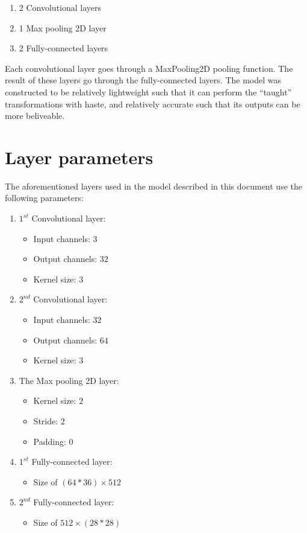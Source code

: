 \documentclass[conference]{IEEEtran}
\begin{document}
\begin{enumerate}
    \item 2 Convolutional layers
    \item 1 Max pooling 2D layer
    \item 2 Fully-connected layers
\end{enumerate}

Each convolutional layer goes through a MaxPooling2D pooling function. The result of these layers go through the fully-connected
layers. The model was constructed to be relatively lightweight such that it can perform the ``taught'' transformations with
haste, and relatively accurate such that its outputs can be more beliveable.

\section{Layer parameters}
The aforementioned layers used in the model described in this document use the following parameters:

\begin{enumerate}
    \item $1^{st}$ Convolutional layer:
    \begin{itemize}
        \item Input channels: $3$
        \item Output channels: $32$
        \item Kernel size: $3$
    \end{itemize}
    \item $2^{nd}$ Convolutional layer:
    \begin{itemize}
        \item Input channels: $32$
        \item Output channels: $64$
        \item Kernel size: $3$
    \end{itemize}
    \item The Max pooling 2D layer:
    \begin{itemize}
        \item Kernel size: $2$
        \item Stride: $2$
        \item Padding: $0$
    \end{itemize}
    \item $1^{st}$ Fully-connected layer:
    \begin{itemize}
        \item Size of $(64 * 36) \times 512$
    \end{itemize}
    \item $2^{nd}$ Fully-connected layer:
    \begin{itemize}
        \item Size of $512 \times (28 * 28)$
    \end{itemize}
\end{enumerate}
\end{document}
